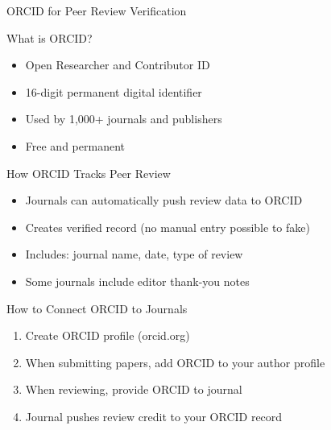 \documentclass[11pt]{beamer}
\begin{document}
				\begin{frame}{ORCID for Peer Review Verification}
					\scriptsize
					\begin{block}{What is ORCID?}
						\begin{itemize}
							\item Open Researcher and Contributor ID
							\item 16-digit permanent digital identifier
							\item Used by 1,000+ journals and publishers
							\item Free and permanent
						\end{itemize}
					\end{block}
					\begin{block}{How ORCID Tracks Peer Review}
						\begin{itemize}
							\item Journals can automatically push review data to ORCID
							\item Creates verified record (no manual entry possible to fake)
							\item Includes: journal name, date, type of review
							\item Some journals include editor thank-you notes
						\end{itemize}
					\end{block}
					\begin{block}{How to Connect ORCID to Journals}
						\begin{enumerate}
							\item Create ORCID profile (orcid.org)
							\item When submitting papers, add ORCID to your author profile
							\item When reviewing, provide ORCID to journal
							\item Journal pushes review credit to your ORCID record
						\end{enumerate}
					\end{block}
				\end{frame}
				
\end{document}
